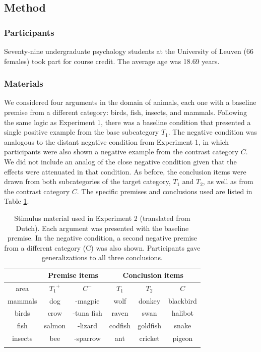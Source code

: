 \documentclass[authoryear,11pt]{elsarticle}
\begin{document}
\subsection{Method}

\subsubsection{Participants}
Seventy-nine undergraduate psychology students at the University of Leuven (66 females) took part for course credit. The average age was 18.69 years.

\subsubsection{Materials}

We considered four arguments in the domain of animals, each one with a baseline premise from a different category: birds, fish, insects, and mammals. Following the same logic as Experiment 1, there was a {\sc baseline} condition that presented a single positive example from the base subcategory $T_1$. The {\sc negative} condition was analogous to the {\sc distant negative condition} from Experiment 1, in which participants were also shown a negative example from the contrast category $C$. We did not include an analog of the {\sc close negative} condition given that the effects were attenuated in that condition. As before, the conclusion items were drawn from both subcategories of the target category, $T_1$ and $T_2$, as well as from the contrast category $C$. The specific premises and conclusions used are listed in Table \ref{table:stimexp2}.

\begin{table}[t!]
\scriptsize
\begin{center}
\caption{Stimulus material used in Experiment 2 (translated from Dutch). Each argument was presented with the {\sc baseline} premise. In the {\sc negative} condition, a second negative premise from a different category (C) was also shown. Participants gave generalizations to all three conclusions.}
\label{table:stimexp2}
\vskip 0.12in
\begin{tabular}{|c|cc|ccc|}
\hline
 & \multicolumn{2}{c}{Premise items} & \multicolumn{3}{c|}{Conclusion items}\\
 \hline
area & ${T_1}^+$ &  $C^-$ &  $T_1$ & $T_2$ & $C$ \\
\hline
mammals & dog & -magpie & wolf & donkey & blackbird\\
birds	& crow & -tuna fish & raven & swan & halibot\\
fish	& salmon & -lizard & codfish & goldfish & snake\\
insects	& bee & -sparrow & ant & cricket & pigeon\\
\hline \multicolumn{6}{c}{ }
\end{tabular}
\end{center}
\end{table}
\end{document}
